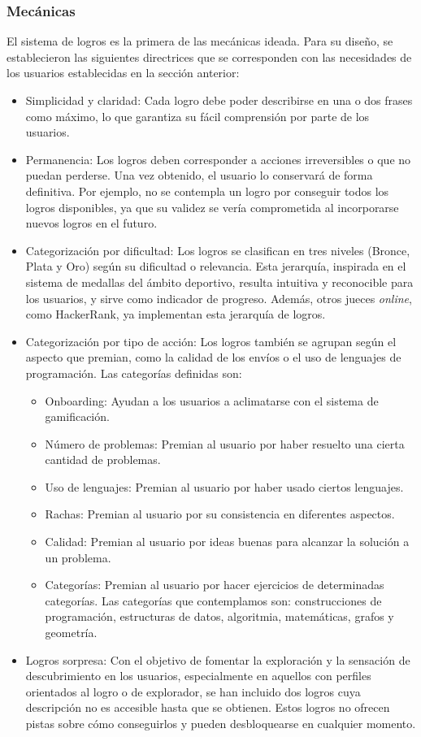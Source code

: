 \subsubsection{Mecánicas}

El sistema de logros es la primera de las mecánicas ideada. Para su diseño, se establecieron las siguientes directrices que se corresponden con las necesidades de los usuarios establecidas en la sección anterior: 
\begin{itemize}
    \item Simplicidad y claridad: Cada logro debe poder describirse en una o dos frases como máximo, lo que garantiza su fácil comprensión por parte de los usuarios.
    \item Permanencia: Los logros deben corresponder a acciones irreversibles o que no puedan perderse. Una vez obtenido, el usuario lo conservará de forma definitiva. Por ejemplo, no se contempla un logro por conseguir todos los logros disponibles, ya que su validez se vería comprometida al incorporarse nuevos logros en el futuro.
    \item Categorización por dificultad: Los logros se clasifican en tres niveles (Bronce, Plata y Oro) según su dificultad o relevancia. Esta jerarquía, inspirada en el sistema de medallas del ámbito deportivo, resulta intuitiva y reconocible para los usuarios, y sirve como indicador de progreso. Además, otros jueces \textit{online}, como HackerRank, ya implementan esta jerarquía de logros.
    \item Categorización por tipo de acción: Los logros también se agrupan según el aspecto que premian, como la calidad de los envíos o el uso de lenguajes de programación. Las categorías definidas son:
    \begin{itemize}
        \item Onboarding: Ayudan a los usuarios a aclimatarse con el sistema de gamificación.
        \item Número de problemas: Premian al usuario por haber resuelto una cierta cantidad de problemas.
        \item Uso de lenguajes: Premian al usuario por haber usado ciertos lenguajes.
        \item Rachas: Premian al usuario por su consistencia en diferentes aspectos.
        \item Calidad: Premian al usuario por ideas buenas para alcanzar la solución a un problema.
        \item Categorías: Premian al usuario por hacer ejercicios de determinadas categorías. Las categorías que contemplamos son: construcciones de programación, estructuras de datos, algoritmia, matemáticas, grafos y geometría. 
    \end{itemize}
    \item Logros sorpresa: Con el objetivo de fomentar la exploración y la sensación de descubrimiento en los usuarios, especialmente en aquellos con perfiles orientados al logro o de explorador, se han incluido dos logros cuya descripción no es accesible hasta que se obtienen. Estos logros no ofrecen pistas sobre cómo conseguirlos y pueden desbloquearse en cualquier momento.
\end{itemize}

